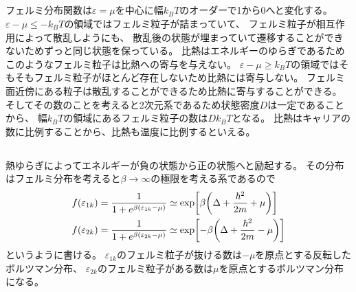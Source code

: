 \documentclass[../../master.tex]{subfiles}
\begin{document}
\subsection{}
フェルミ分布関数は\(\varepsilon=\mu\)を中心に幅\(k_BT\)のオーダーで1から0へと変化する。
\(\varepsilon-\mu\le -k_BT\)の領域ではフェルミ粒子が詰まっていて、
フェルミ粒子が相互作用によって散乱しようにも、
散乱後の状態が埋まっていて遷移することができないためずっと同じ状態を保っている。
比熱はエネルギーのゆらぎであるためこのようなフェルミ粒子は比熱への寄与を与えない。
\(\varepsilon-\mu\ge k_BT\)の領域ではそもそもフェルミ粒子がほとんど存在しないため比熱には寄与しない。
フェルミ面近傍にある粒子は散乱することができるため比熱に寄与することができる。
そしてその数のことを考えると2次元系であるため状態密度\(D\)は一定であることから、
幅\(k_BT\)の領域にあるフェルミ粒子の数は\(Dk_BT\)となる。
比熱はキャリアの数に比例することから、比熱も温度に比例するといえる。

\subsection{}
熱ゆらぎによってエネルギーが負の状態から正の状態へと励起する。
その分布はフェルミ分布を考えると\(\beta\to\infty\)の極限を考える系であるので
\begin{equation}\begin{aligned}[b]
    f(\varepsilon_{1k})
    &=\frac{1}{1+e^{\beta(\varepsilon_{1k}-\mu)}}
    \simeq \exp[\beta\qty(\Delta+\frac{\hbar^2}{2m}+\mu)]\\
    f(\varepsilon_{2k})
    &=\frac{1}{1+e^{\beta(\varepsilon_{2k}-\mu)}}
    \simeq \exp[-\beta\qty(\Delta+\frac{\hbar^2}{2m}-\mu)]\\
\end{aligned}\end{equation}
というように書ける。
\(\varepsilon_{1k}\)のフェルミ粒子が抜ける数は\(-\mu\)を原点とする反転したボルツマン分布、
\(\varepsilon_{2k}\)のフェルミ粒子がある数は\(\mu\)を原点とするボルツマン分布になる。
\end{document}
